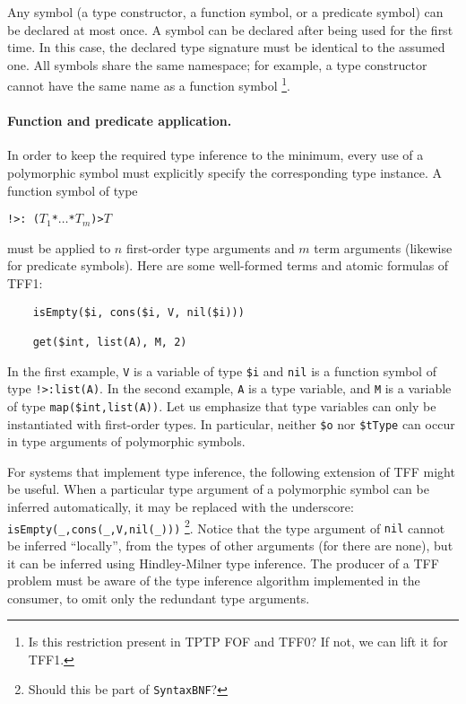 Any symbol (a type constructor, a function symbol, or a predicate symbol)
can be declared at most once. A symbol can be declared after being used
for the first time. In this case, the declared type signature must be
identical to the assumed one. All symbols share the same namespace; for
example, a type constructor cannot have the same name as a function symbol%
\footnote{Is this restriction present in TPTP FOF and TFF0? If not, we can
lift it for TFF1.}.

\paragraph{Function and predicate application.} In order to keep
the required type inference to the minimum, every use of a polymorphic
symbol must explicitly specify the corresponding type instance.
A function symbol of type
\begin{center}
{\tt !>\;:\;%
($T_1$\;*\;$\dots$\;*\;$T_m$)\;>\;$T$}
\end{center}
must be applied to $n$ first-order type arguments and $m$ term arguments
(likewise for predicate symbols). Here are some well-formed
terms and atomic formulas of TFF1:
\begin{verbatim}
    isEmpty($i, cons($i, V, nil($i)))

    get($int, list(A), M, 2)
\end{verbatim}
In the first example, {\tt V} is a variable of type {\tt \$i}
and {\tt nil} is a function
symbol of type {\tt !>\;[A:\$tType]\;:\;list(A)}. In the second
example, {\tt A} is a type variable, and {\tt M} is a variable
of type {\tt map(\$int,list(A))}. Let us emphasize that type
variables can only be instantiated with first-order types.
In particular, neither \verb+$o+ nor \verb+$tType+ can occur
in type arguments of polymorphic symbols.

For systems that implement type inference, the following extension
of TFF might be useful. When a particular type argument of
a polymorphic symbol can be inferred automatically, it may be
replaced with the underscore: \verb+isEmpty(_,cons(_,V,nil(_)))+%
\footnote{Should this be part of {\tt SyntaxBNF}?}.
Notice that the type argument of {\tt nil} cannot be inferred
``locally'', from the types of other arguments (for there are none),
but it can be inferred using Hindley-Milner type inference.
The producer of a TFF problem must be aware of the type
inference algorithm implemented in the consumer, to omit
only the redundant type arguments.

